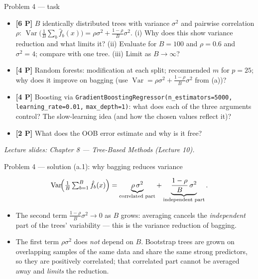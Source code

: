 \documentclass[aspectratio=169,11pt]{beamer}
\begin{document}
\begin{frame}{Problem 4 --- task}
  \begin{exercise}
    \begin{itemize}
      \item[(a)] \textbf{[6 P]} $B$ identically distributed trees with variance $\sigma^2$ and
        pairwise correlation $\rho$:
        $\operatorname{Var}\bigl(\frac1B\sum_b\hat f_b(x)\bigr)=\rho\sigma^2+\frac{1-\rho}{B}\sigma^2$.
        (i) Why does this show variance reduction and what limits it?
        (ii) Evaluate for $B=100$ and $\rho=0.6$ and $\sigma^2=4$; compare with one tree.
        (iii) Limit as $B\to\infty$?
      \item[(b)] \textbf{[4 P]} Random forests: modification at each split; recommended $m$
        for $p=25$; why does it improve on bagging (use
        $\operatorname{Var}=\rho\sigma^2+\frac{1-\rho}{B}\sigma^2$ from (a))?
      \item[(c)] \textbf{[4 P]} Boosting via
        \texttt{GradientBoostingRegressor(n\_estimators=5000,} \texttt{learning\_rate=0.01,}
        \texttt{max\_depth=1)}: what does each of the three arguments control? The
        slow-learning idea (and how the chosen values reflect it)?
      \item[(d)] \textbf{[2 P]} What does the OOB error estimate and why is it free?
    \end{itemize}
  \end{exercise}
  {\scriptsize\itshape Lecture slides: Chapter 8 --- Tree-Based Methods (Lecture 10).}
\end{frame}

\begin{frame}{Problem 4 --- solution (a.1): why bagging reduces variance}
  \begin{solutionbox}
    \[
      \operatorname{Var}\!\Bigl(\tfrac1B\textstyle\sum_{b=1}^B \hat f_b(x)\Bigr)
      =\underbrace{\rho\,\sigma^2}_{\text{correlated part}}
      +\underbrace{\frac{1-\rho}{B}\,\sigma^2}_{\text{independent part}} .
    \]
    \begin{itemize}
      \item The second term $\frac{1-\rho}{B}\sigma^2\to0$ as $B$ grows: averaging cancels the
        \emph{independent} part of the trees' variability --- this is the variance reduction of
        bagging.
      \item The first term $\rho\sigma^2$ does \emph{not} depend on $B$. Bootstrap trees are grown
        on overlapping samples of the same data and share the same strong predictors, so they are
        positively correlated; that correlated part cannot be averaged away and \emph{limits} the
        reduction.
    \end{itemize}
  \end{solutionbox}
\end{frame}
\end{document}
